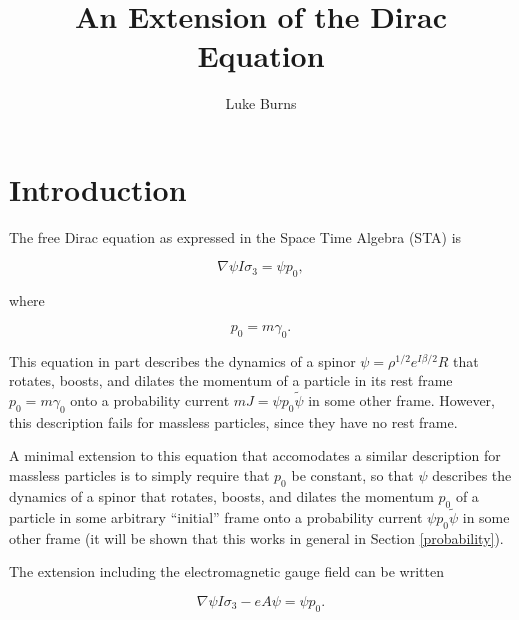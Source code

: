 \documentclass{article}
\title{An Extension of the Dirac Equation}
\author{Luke Burns}
\begin{document}
  \maketitle


  \section{Introduction}

  The free Dirac equation as expressed in the Space Time Algebra (STA) is\cite{gap}

  \begin{equation}
    \nabla \psi I \sigma_3 = \psi p_0, \label{eq:dirac}
  \end{equation}

  where

  \begin{equation}
    p_0 = m \gamma_0. \label{eq:mass}
  \end{equation} 

  This equation in part describes the dynamics of a spinor $\psi = \rho^{1/2} e^{I \beta/2}R$ that rotates, boosts, and dilates the momentum of a particle in its rest frame $p_0 = m \gamma_0$ onto a probability current $mJ = \psi p_0 \widetilde \psi$ in some other frame. However, this description fails for massless particles, since they have no rest frame.

  A minimal extension to this equation that accomodates a similar description for massless particles is to simply require that $p_0$ be constant, so that $\psi$ describes the dynamics of a spinor that rotates, boosts, and dilates the momentum $p_0$ of a particle in some arbitrary ``initial'' frame onto a probability current $\psi p_0 \widetilde \psi$ in some other frame (it will be shown that this works in general in Section \ref{probability}).

  The extension including the electromagnetic gauge field can be written

  \begin{equation}
    \nabla \psi I \sigma_3 - e A \psi = \psi p_0. \label{eq:full}
  \end{equation}
\end{document}
